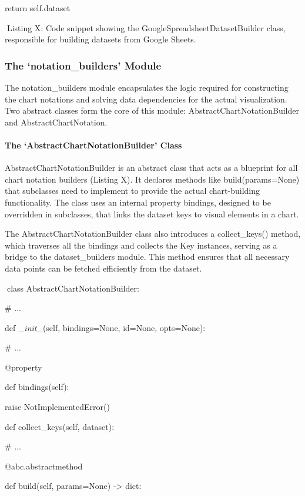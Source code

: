 \documentclass[
]{article}
\begin{document}
return self.dataset

Listing X: Code snippet showing the GoogleSpreadsheetDatasetBuilder
class, responsible for building datasets from Google Sheets.

\subsubsection{The `notation\_builders'
Module}\label{the-notation_builders-module}

The notation\_builders module encapsulates the logic required for
constructing the chart notations and solving data dependencies for the
actual visualization. Two abstract classes form the core of this module:
AbstractChartNotationBuilder and AbstractChartNotation.

\paragraph{The `AbstractChartNotationBuilder'
Class}\label{the-abstractchartnotationbuilder-class}

AbstractChartNotationBuilder is an abstract class that acts as a
blueprint for all chart notation builders (Listing X). It declares
methods like build(params=None) that subclasses need to implement to
provide the actual chart-building functionality. The class uses an
internal property bindings, designed to be overridden in subclasses,
that links the dataset keys to visual elements in a chart.

The AbstractChartNotationBuilder class also introduces a collect\_keys()
method, which traverses all the bindings and collects the Key instances,
serving as a bridge to the dataset\_builders module. This method ensures
that all necessary data points can be fetched efficiently from the
dataset.

class AbstractChartNotationBuilder:

\# ...

def \emph{\_init\_}(self, bindings=None, id=None, opts=None):

\# ...

@property

def bindings(self):

raise NotImplementedError()

def collect\_keys(self, dataset):

\# ...

@abc.abstractmethod

def build(self, params=None) -\textgreater{} dict:
\end{document}
